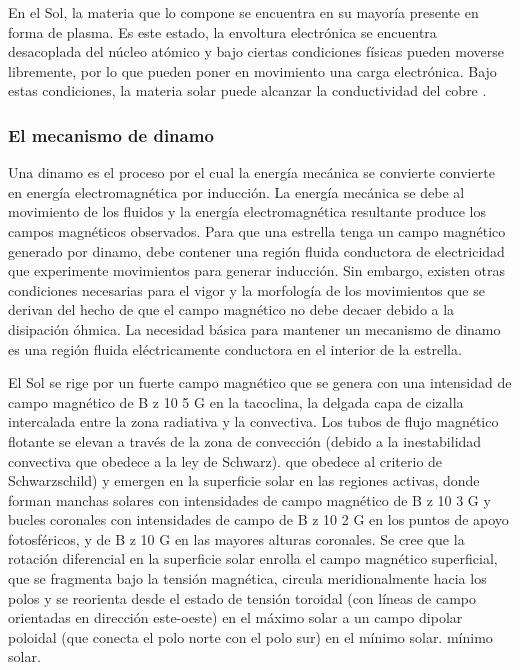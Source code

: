 En el Sol, la materia que lo compone se encuentra en su mayoría presente en forma de plasma. Es este estado, la envoltura electrónica se encuentra desacoplada del núcleo atómico y bajo ciertas condiciones físicas pueden moverse libremente, por lo que pueden poner en movimiento una carga electrónica. Bajo estas condiciones, la materia solar puede alcanzar la conductividad del cobre \cite{Banisch2009}.\par

\subsubsection{El mecanismo de dinamo}
Una dinamo es el proceso por el cual la energía mecánica se convierte
convierte en energía electromagnética por inducción. La energía mecánica se debe al movimiento de los fluidos y la energía electromagnética resultante produce los campos magnéticos observados. Para que una estrella tenga un campo magnético generado por dinamo, debe contener una región fluida conductora de electricidad que experimente movimientos para generar inducción. Sin embargo, existen otras condiciones necesarias para el vigor y la morfología de los movimientos que se derivan del hecho de que el campo magnético no debe decaer debido a la disipación óhmica. La necesidad básica para mantener un mecanismo de dinamo es una región fluida eléctricamente conductora en el interior de la estrella.

El Sol se rige por un fuerte campo magnético que se genera con una intensidad de campo magnético de B z 10 5 G \cite{Aschwanden2014} en la tacoclina, la delgada capa de cizalla intercalada entre la zona radiativa y la convectiva. Los tubos de flujo magnético flotante se elevan a través de la zona de convección (debido a la inestabilidad convectiva que obedece a la ley de Schwarz).
que obedece al criterio de Schwarzschild) y emergen en la superficie solar en las regiones activas, donde forman manchas solares con intensidades de campo magnético de B z 10 3 G y bucles coronales con intensidades de campo de B z 10 2 G en los puntos de apoyo fotosféricos, y de B z 10 G en las mayores alturas coronales. Se cree que la rotación diferencial en la superficie solar enrolla el campo magnético superficial, que se fragmenta bajo la tensión magnética, circula meridionalmente hacia los polos y se reorienta desde el estado de tensión toroidal (con líneas de campo orientadas en dirección este-oeste) en el máximo solar a un campo dipolar poloidal (que conecta el polo norte con el polo sur) en el mínimo solar.
mínimo solar.

